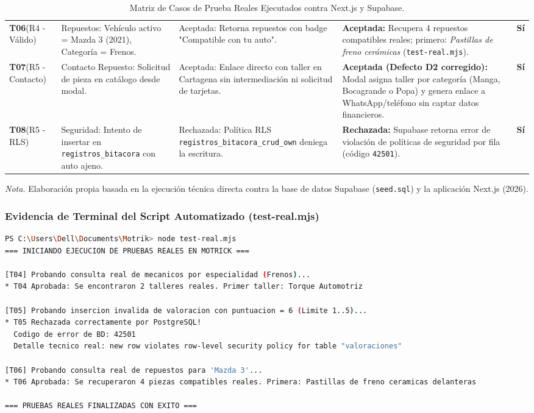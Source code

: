 \documentclass[11pt,letterpaper]{article}
\newcommand{\figurenote}[1]{\vspace{2mm}\small\noindent\textit{Nota.} #1\vspace{4mm}}
\begin{document}
\begin{table}[h!]
\begin{tabularx}{\textwidth}{p{1.8cm}p{3.8cm}p{3.5cm}X>{\centering\arraybackslash}p{1.2cm}}
\textbf{T06}\newline(R4 - Válido) & Repuestos: Vehículo activo = Mazda 3 (2021), Categoría = Frenos. & Aceptada: Retorna repuestos con badge "Compatible con tu auto". & \textbf{Aceptada:} Recupera 4 repuestos compatibles reales; primero: \textit{Pastillas de freno cerámicas} (\texttt{test-real.mjs}). & \textbf{\color{succgreen}Sí} \\
\addlinespace
\textbf{T07}\newline(R5 - Contacto) & Contacto Repuesto: Solicitud de pieza en catálogo desde modal. & Aceptada: Enlace directo con taller en Cartagena sin intermediación ni solicitud de tarjetas. & \textbf{Aceptada (Defecto D2 corregido):} Modal asigna taller por categoría (Manga, Bocagrande o Popa) y genera enlace a WhatsApp/teléfono sin captar datos financieros. & \textbf{\color{succgreen}Sí} \\
\addlinespace
\textbf{T08}\newline(R5 - RLS) & Seguridad: Intento de insertar en \texttt{registros\_bitacora} con auto ajeno. & Rechazada: Política RLS \texttt{registros\_bitacora\_crud\_own} deniega la escritura. & \textbf{Rechazada:} Supabase retorna error de violación de políticas de seguridad por fila (código \texttt{42501}). & \textbf{\color{succgreen}Sí} \\
\bottomrule
\end{tabularx}
\caption{Matriz de Casos de Prueba Reales Ejecutados contra Next.js y Supabase.}
\end{table}
\figurenote{Elaboración propia basada en la ejecución técnica directa contra la base de datos Supabase (\texttt{seed.sql}) y la aplicación Next.js (2026).}

\newpage

\subsubsection{Evidencia de Terminal del Script Automatizado (test-real.mjs)}
\begin{lstlisting}[language=bash]
PS C:\Users\Dell\Documents\Motrik> node test-real.mjs
=== INICIANDO EJECUCION DE PRUEBAS REALES EN MOTRICK ===

[T04] Probando consulta real de mecanicos por especialidad (Frenos)...
* T04 Aprobada: Se encontraron 2 talleres reales. Primer taller: Torque Automotriz

[T05] Probando insercion invalida de valoracion con puntuacion = 6 (Limite 1..5)...
* T05 Rechazada correctamente por PostgreSQL!
  Codigo de error de BD: 42501
  Detalle tecnico real: new row violates row-level security policy for table "valoraciones"

[T06] Probando consulta real de repuestos para 'Mazda 3'...
* T06 Aprobada: Se recuperaron 4 piezas compatibles reales. Primera: Pastillas de freno ceramicas delanteras

=== PRUEBAS REALES FINALIZADAS CON EXITO ===
\end{lstlisting}
\end{document}
